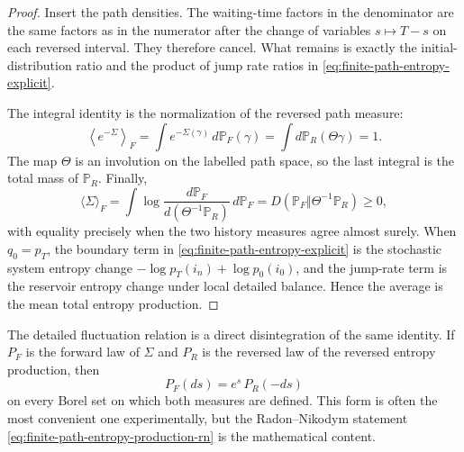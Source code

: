 \begin{proof}
Insert the path densities.  The waiting-time factors in the denominator are
the same factors as in the numerator after the change of variables
\(s\mapsto T-s\) on each reversed interval.  They therefore cancel.  What
remains is exactly the initial-distribution ratio and the product of jump
rate ratios in \eqref{eq:finite-path-entropy-explicit}.

The integral identity is the normalization of the reversed path measure:
\[
  \left\langle e^{-\Sigma}\right\rangle_F
  =
  \int e^{-\Sigma(\gamma)}\,d\mathbb P_F(\gamma)
  =
  \int d\mathbb P_R(\Theta\gamma)
  =
  1 .
\]
The map \(\Theta\) is an involution on the labelled path space, so the last
integral is the total mass of \(\mathbb P_R\).  Finally,
\[
  \langle\Sigma\rangle_F
  =
  \int
  \log\frac{d\mathbb P_F}{d(\Theta^{-1}\mathbb P_R)}
  \,d\mathbb P_F
  =
  D(\mathbb P_F\Vert\Theta^{-1}\mathbb P_R)\ge0,
\]
with equality precisely when the two history measures agree almost surely.
When \(q_0=p_T\), the boundary term in
\eqref{eq:finite-path-entropy-explicit} is the stochastic system entropy
change \(-\log p_T(i_n)+\log p_0(i_0)\), and the jump-rate term is the
reservoir entropy change under local detailed balance.  Hence the average
is the mean total entropy production.
\end{proof}

The detailed fluctuation relation is a direct disintegration of the same
identity.  If \(P_F\) is the forward law of \(\Sigma\) and \(P_R\) is the
reversed law of the reversed entropy production, then
\[
  P_F(ds)=e^{s}\,P_R(-ds)
\]
on every Borel set on which both measures are defined.  This form is often
the most convenient one experimentally, but the Radon--Nikodym statement
\eqref{eq:finite-path-entropy-production-rn} is the mathematical content.


